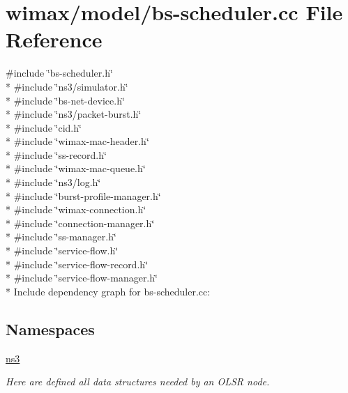 \hypertarget{bs-scheduler_8cc}{}\section{wimax/model/bs-\/scheduler.cc File Reference}
\label{bs-scheduler_8cc}
{\ttfamily \#include \char`\"{}bs-\/scheduler.\+h\char`\"{}}\\*
{\ttfamily \#include \char`\"{}ns3/simulator.\+h\char`\"{}}\\*
{\ttfamily \#include \char`\"{}bs-\/net-\/device.\+h\char`\"{}}\\*
{\ttfamily \#include \char`\"{}ns3/packet-\/burst.\+h\char`\"{}}\\*
{\ttfamily \#include \char`\"{}cid.\+h\char`\"{}}\\*
{\ttfamily \#include \char`\"{}wimax-\/mac-\/header.\+h\char`\"{}}\\*
{\ttfamily \#include \char`\"{}ss-\/record.\+h\char`\"{}}\\*
{\ttfamily \#include \char`\"{}wimax-\/mac-\/queue.\+h\char`\"{}}\\*
{\ttfamily \#include \char`\"{}ns3/log.\+h\char`\"{}}\\*
{\ttfamily \#include \char`\"{}burst-\/profile-\/manager.\+h\char`\"{}}\\*
{\ttfamily \#include \char`\"{}wimax-\/connection.\+h\char`\"{}}\\*
{\ttfamily \#include \char`\"{}connection-\/manager.\+h\char`\"{}}\\*
{\ttfamily \#include \char`\"{}ss-\/manager.\+h\char`\"{}}\\*
{\ttfamily \#include \char`\"{}service-\/flow.\+h\char`\"{}}\\*
{\ttfamily \#include \char`\"{}service-\/flow-\/record.\+h\char`\"{}}\\*
{\ttfamily \#include \char`\"{}service-\/flow-\/manager.\+h\char`\"{}}\\*
Include dependency graph for bs-\/scheduler.cc\+:
\subsection*{Namespaces}
\begin{DoxyCompactItemize}
\item 
 \hyperlink{namespacens3}{ns3}
\begin{DoxyCompactList}\small\item\em Here are defined all data structures needed by an O\+L\+SR node. \end{DoxyCompactList}\end{DoxyCompactItemize}
